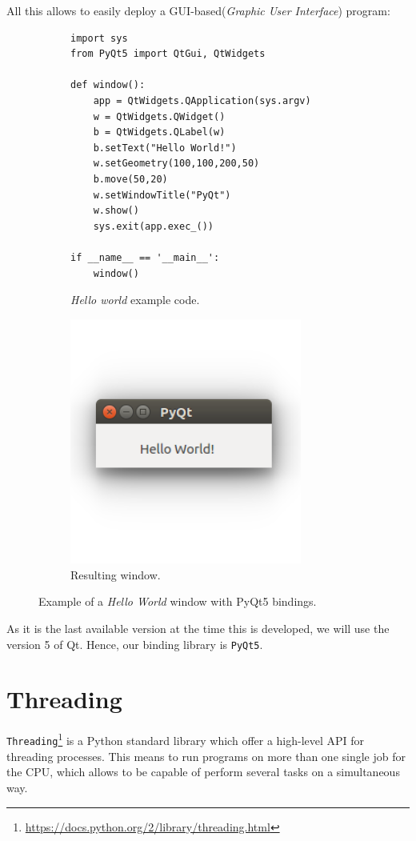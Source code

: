 	All this allows to easily deploy a GUI-based(\emph{Graphic User Interface}) program:
	\begin{figure}[h]
		\centering
		\begin{subfigure}[h]{0.55\linewidth}
			\centering
			\begin{lstlisting}
import sys
from PyQt5 import QtGui, QtWidgets

def window():
	app = QtWidgets.QApplication(sys.argv)
	w = QtWidgets.QWidget()
	b = QtWidgets.QLabel(w)
	b.setText("Hello World!")
	w.setGeometry(100,100,200,50)
	b.move(50,20)
	w.setWindowTitle("PyQt")
	w.show()
	sys.exit(app.exec_())

if __name__ == '__main__':
	window()
			\end{lstlisting}
			\caption{\emph{Hello world} example code.}
		\end{subfigure}
		\qquad
		\begin{subfigure}[h]{0.35\linewidth}
			\centering
			\includegraphics[width=3in]{images/pyqt_helloworld}
			\caption{Resulting window.}
		\end{subfigure}
		\caption{Example of a \emph{Hello World} window with PyQt5 bindings.}
		\label{fig:3_pyqt_helloworld}
	\end{figure}
	
	As it is the last available version at the time this is developed, we will use the version 5 of Qt. Hence, our binding library is \texttt{PyQt5}.\\
	
\section{Threading}
	\texttt{Threading}\footnote{\url{https://docs.python.org/2/library/threading.html}} is a Python standard library which offer a high-level API for threading processes. This means to run programs on more than one single job for the CPU, which allows to be capable of perform several tasks on a simultaneous way.\\
	
